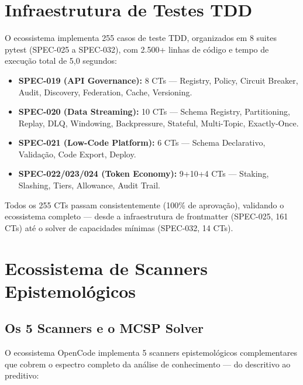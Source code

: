 \section{Infraestrutura de Testes TDD}

O ecossistema implementa 255 casos de teste TDD, organizados em 8 suites pytest (SPEC-025 a SPEC-032), com 2.500+ linhas de código e tempo de execução total de 5,0 segundos:

\begin{itemize}
  \item \textbf{SPEC-019 (API Governance):} 8 CTs --- Registry, Policy, Circuit Breaker, Audit, Discovery, Federation, Cache, Versioning.
  \item \textbf{SPEC-020 (Data Streaming):} 10 CTs --- Schema Registry, Partitioning, Replay, DLQ, Windowing, Backpressure, Stateful, Multi-Topic, Exactly-Once.
  \item \textbf{SPEC-021 (Low-Code Platform):} 6 CTs --- Schema Declarativo, Validação, Code Export, Deploy.
  \item \textbf{SPEC-022/023/024 (Token Economy):} 9+10+4 CTs --- Staking, Slashing, Tiers, Allowance, Audit Trail.
\end{itemize}

Todos os 255 CTs passam consistentemente (100\% de aprovação), validando o ecossistema completo — desde a infraestrutura de frontmatter (SPEC-025, 161 CTs) até o solver de capacidades mínimas (SPEC-032, 14 CTs).

\section{Ecossistema de Scanners Epistemológicos}

\subsection{Os 5 Scanners e o MCSP Solver}

O ecossistema OpenCode implementa 5 scanners epistemológicos complementares que cobrem o espectro completo da análise de conhecimento --- do descritivo ao preditivo:

